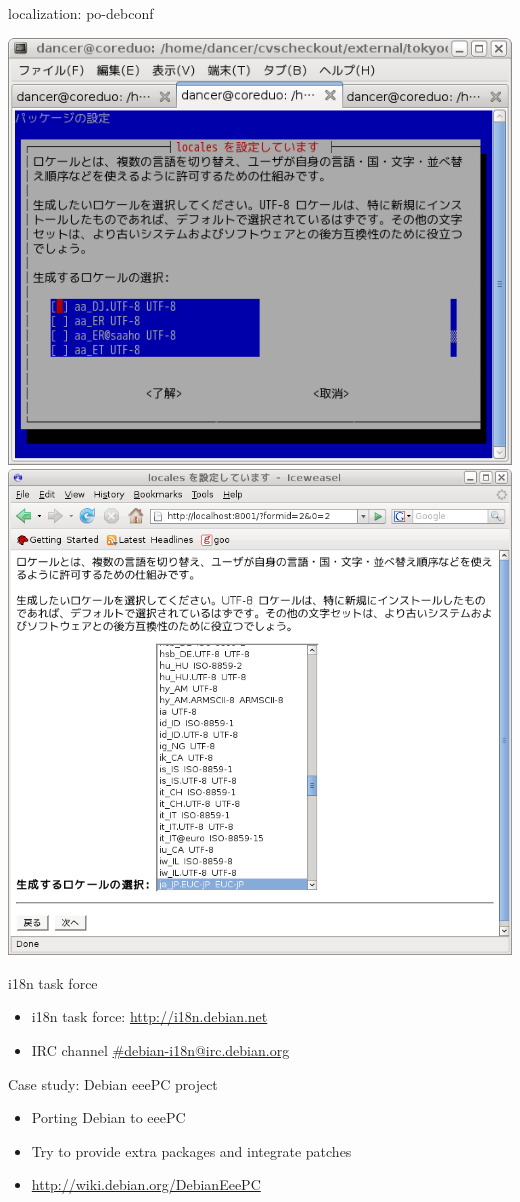 \documentclass[cjk,dvipdfm,12pt]{beamer}
\begin{document}
\begin{frame}{localization: po-debconf}

 \includegraphics[width=0.5\hsize]{image200805/debconf-text.png}
 \includegraphics[width=0.5\hsize]{image200805/debconf-locales.png}

\end{frame}

\begin{frame}{i18n task force}
 \begin{itemize}
  \item i18n task force: \url{http://i18n.debian.net}
  \item IRC channel \url{\#debian-i18n@irc.debian.org}
 \end{itemize}
\end{frame}

\begin{frame}{Case study: Debian eeePC project}
 \begin{itemize}
  \item Porting Debian to eeePC
  \item Try to provide extra packages and integrate patches
  \item \url{http://wiki.debian.org/DebianEeePC}
 \end{itemize}
\end{frame}
\end{document}
